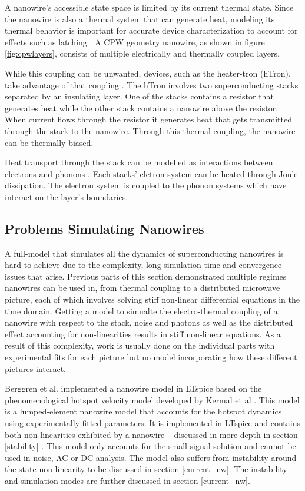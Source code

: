 \documentclass[]{article}
\newcommand{\todo}[2][]{}
\begin{document}
A nanowire's accessible state space is limited by its current thermal state.
Since the nanowire is also a thermal system that can generate heat,
modeling its thermal behavior is important for
accurate device characterization to account for effects such as latching 
\cite{electro_thermal_modelling}.
A CPW geometry nanowire, as shown in figure \ref{fig:cpwlayers}, consists 
of multiple electrically and thermally coupled layers. 

While this coupling can be unwanted, devices, such as the heater-tron (hTron), 
take advantage of that coupling \cite{htron_paper}. 
The hTron involves two superconducting stacks separated
by an insulating layer. One of the stacks contains a resistor that generates heat while the
other stack contains a nanowire above the resistor. When current flows through the resistor
it generates heat that gets transmitted through the stack to the nanowire. Through this thermal
coupling, the nanowire can be thermally biased.

Heat transport through the stack can be modelled as interactions between electrons 
and phonons \cite{htron_paper}. Each stacks' eletron system can be heated through
Joule dissipation. The electron system is coupled to the phonon systems which
have interact on the layer's boundaries.

\todo[]{reuse rezas thermal transport block diagram? and ref+cite it}

\subsection{Problems Simulating Nanowires}

A full-model that simulates all the dynamics of superconducting nanowires is hard to achieve
due to the complexity, long simulation time and convergence issues
that arise.
Previous parts of this section demonstrated multiple regimes nanowires can be used in,
from thermal coupling to a distributed microwave picture, each of which involves solving
stiff non-linear differential equations in the time domain. Getting a model to simualte
the electro-thermal coupling of a nanowire with respect to the stack, noise and photons
as well as the distributed effect accounting for non-linearities results in stiff non-linear
equations. 
As a result of this complexity, work is usually done on the individual parts
with experimental fits for each picture but no model incorporating how these
different pictures interact. 

Berggren et al. implemented a nanowire model in LTspice based on the phenomenological hotspot 
velocity model developed by Kermal et al \cite{karl_spice, phen_model}. 
This model is a lumped-element nanowire model that accounts 
for the hotspot dynamics using experimentally fitted parameters. It is implemented in LTspice
and contains both non-linearities exhibited by a nanowire -- discussed in more depth 
in section \ref{stability} \cite{karl_spice}. This model only 
accounts for the small signal solution and cannot be used in noise, AC or DC analysis.
The model also suffers from instability around the state non-linearity to be discussed in section \ref{current_nw}. The instability and 
simulation modes are further discussed in section \ref{current_nw}.
\end{document}
